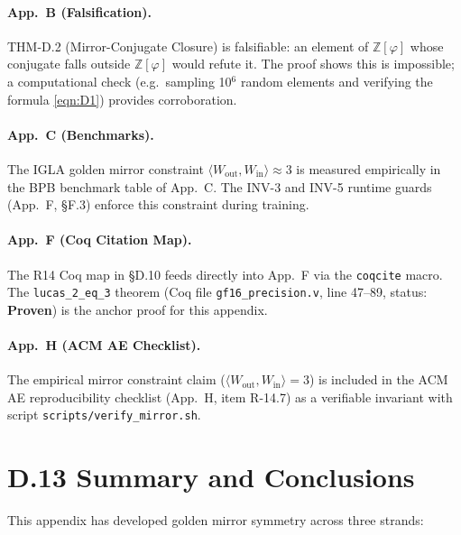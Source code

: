 \paragraph{App.~B (Falsification).}
THM-D.2 (Mirror-Conjugate Closure) is falsifiable: an element of
$\mathbb{Z}[\varphi]$ whose conjugate falls outside $\mathbb{Z}[\varphi]$ would
refute it.  The proof shows this is impossible; a computational check
(e.g.\ sampling 10$^6$ random elements and verifying the formula \eqref{eqn:D1})
provides corroboration.

\paragraph{App.~C (Benchmarks).}
The IGLA golden mirror constraint $\langle W_\mathrm{out}, W_\mathrm{in}\rangle \approx 3$
is measured empirically in the BPB benchmark table of App.~C.  The INV-3
and INV-5 runtime guards (App.~F, \S F.3) enforce this constraint during training.

\paragraph{App.~F (Coq Citation Map).}
The R14 Coq map in \S D.10 feeds directly into App.~F via the
\texttt{coqcite} macro.  The \texttt{lucas\_2\_eq\_3} theorem
(Coq file \texttt{gf16\_precision.v}, line 47--89, status: \textbf{Proven})
is the anchor proof for this appendix.

\paragraph{App.~H (ACM AE Checklist).}
The empirical mirror constraint claim ($\langle W_\mathrm{out},W_\mathrm{in}\rangle = 3$) is
included in the ACM AE reproducibility checklist (App.~H, item R-14.7)
as a verifiable invariant with script \texttt{scripts/verify\_mirror.sh}.

\section*{D.13  Summary and Conclusions}

This appendix has developed golden mirror symmetry across three strands:

